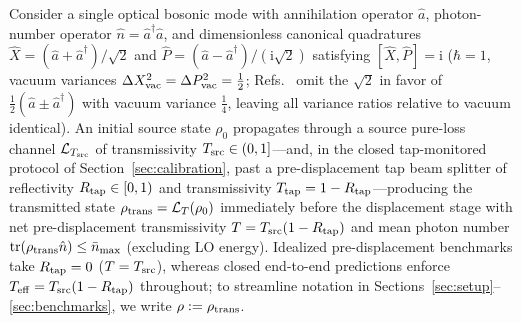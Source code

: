 \documentclass{iopjournal}
\newcommand{\tr}{\operatorname{tr}}
\newcommand{\nbar}{\bar n_{\max}}
\newcommand{\ii}{\mathrm{i}}
\newcommand{\calL}{\mathcal{L}}
\begin{document}
Consider a single optical bosonic mode with annihilation operator $\hat a$, photon-number operator $\hat n = \hat a^\dagger \hat a$, and dimensionless canonical quadratures $\hat X = (\hat a + \hat a^\dagger)/\sqrt{2}$ and $\hat P = (\hat a - \hat a^\dagger)/(\ii\sqrt{2})$ satisfying $[\hat X, \hat P] = \ii$ ($\hbar = 1$, vacuum variances $\Delta X^2_{\rm vac} = \Delta P^2_{\rm vac} = \frac{1}{2}$; Refs.~\cite{ScullyZubairy1997,Loudon2000,GerryKnight2005} omit the $\sqrt{2}$ in favor of $\frac{1}{2}(\hat a \pm \hat a^\dagger)$ with vacuum variance $\frac{1}{4}$, leaving all variance ratios relative to vacuum identical). An initial source state $\rho_0$ propagates through a source pure-loss channel $\calL_{T_{\rm src}}$ of transmissivity $T_{\rm src} \in (0,1]$---and, in the closed tap-monitored protocol of Section~\ref{sec:calibration}, past a pre-displacement tap beam splitter of reflectivity $R_{\rm tap} \in [0,1)$ and transmissivity $T_{\rm tap} = 1 - R_{\rm tap}$---producing the transmitted state $\rho_{\rm trans} = \calL_T(\rho_0)$ immediately before the displacement stage with net pre-displacement transmissivity $T = T_{\rm src}(1 - R_{\rm tap})$ and mean photon number $\tr(\rho_{\rm trans}\hat n) \le \nbar$ (excluding LO energy). Idealized pre-displacement benchmarks take $R_{\rm tap} = 0$ ($T = T_{\rm src}$), whereas closed end-to-end predictions enforce $T_{\rm eff} = T_{\rm src}(1 - R_{\rm tap})$ throughout; to streamline notation in Sections~\ref{sec:setup}--\ref{sec:benchmarks}, we write $\rho := \rho_{\rm trans}$.
\end{document}
